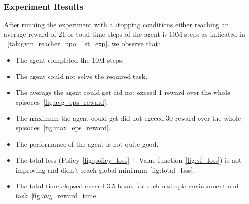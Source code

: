 \subsubsection{Experiment Results}

After running the experiment with a stopping conditions either reaching an average reward of 21 or total time steps of the agent is 10M steps as indicated in ~\ref{tab:gym_reacher_ppo_1st_exp}.
we observe that:

\begin{itemize}
		\item The agent completed the 10M steps.
		\item The agent could not solve the required task.
		\item The average the agent could get did not exceed 1 reward over the whole episodes~\ref{fig:avg_eps_reward}.
		\item The maximum the agent could get did not exceed 30 reward over the whole episodes~\ref{fig:max_eps_reward}.
		\item The performance of the agent is not quite good.
		\item The total loss (Policy~\ref{fig:policy_loss} + Value function~\ref{fig:vf_loss}) is not improving and didn't reach global minimum~\ref{fig:total_loss}.
		\item The total time elapsed exceed 3.5 hours for such a simple environment and task~\ref{fig:avg_reward_time}.
\end{itemize}

